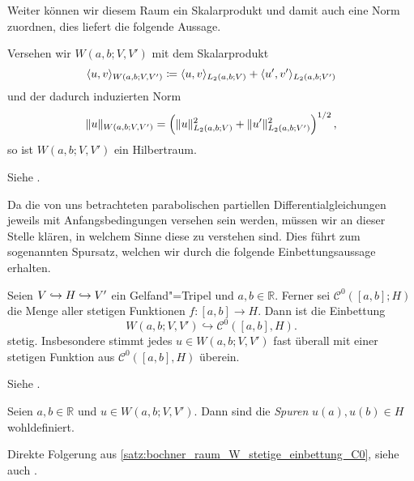 Weiter können wir diesem Raum ein Skalarprodukt und damit auch eine Norm zuordnen, dies liefert die folgende Aussage.

\begin{Lemma}
\label{lemma:bochner_W_ist_hilbertraum}
    Versehen wir $W(a, b; V, V')$ mit dem Skalarprodukt
    \begin{equation}
        \langle u,v\rangle_{W(a, b; V, V')} \coloneqq \langle u,v\rangle_{L_{2}(a, b; V)} + \langle u',v'\rangle_{L_{2}(a, b; V')}
    \end{equation}
    und der dadurch induzierten Norm
    \begin{equation}
        \lVert u\rVert_{W(a, b; V, V')} = \left( \lVert u\rVert_{L_{2}(a, b; V)}^{2} + \lVert u'\rVert_{L_{2}(a, b; V')}^{2} \right)^{1/2},
    \end{equation}
    so ist $W(a, b; V, V')$ ein Hilbertraum.

    \begin{Beweis}
        Siehe \cite[Proposition XVIII.2.6]{Dautray:1992by}.
    \end{Beweis}
\end{Lemma}

Da die von uns betrachteten parabolischen partiellen Differentialgleichungen jeweils mit Anfangsbedingungen versehen sein werden, müssen wir an dieser Stelle klären, in welchem Sinne diese zu verstehen sind.
Dies führt zum sogenannten Spursatz, welchen wir durch die folgende Einbettungsaussage erhalten.

\begin{Satz}
\label{satz:bochner_raum_W_stetige_einbettung_C0}
    Seien $V \hookrightarrow H \hookrightarrow V'$ ein Gelfand"=Tripel und $a, b \in \mathbb{R}$.
    Ferner sei $\mathcal C^{0}([a, b]; H)$ die Menge aller stetigen Funktionen $f \colon [a, b] \to H$.
    Dann ist die Einbettung
    \begin{equation}
        W(a, b; V, V') \hookrightarrow \mathcal C^{0}([a, b], H).
    \end{equation}
    stetig.
    Insbesondere stimmt jedes $u \in W(a, b; V, V')$ fast überall mit einer stetigen Funktion aus $\mathcal C^{0}([a, b], H)$ überein.

    \begin{Beweis}
        Siehe \cites[Theorem XVIII.2.1]{Dautray:1992by}[Theorem 10.9]{Schweizer2013}.
    \end{Beweis}
\end{Satz}

\begin{Korollar}[Spursatz]
\label{korollar:spursatz}
    Seien $a, b \in \mathbb{R}$ und $u \in W(a, b; V, V')$.
    Dann sind die \emph{Spuren} $u(a), u(b) \in H$ wohldefiniert.

    \begin{Beweis}
        Direkte Folgerung aus \cref{satz:bochner_raum_W_stetige_einbettung_C0}, siehe auch \cite[Remark XVIII.2.4]{Dautray:1992by}.
    \end{Beweis}
\end{Korollar}

